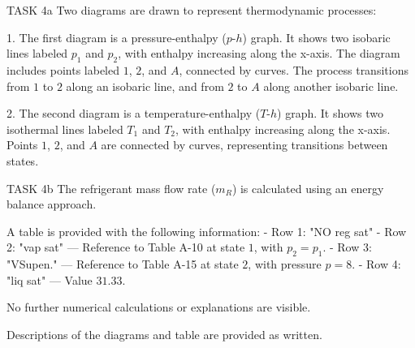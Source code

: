 TASK 4a  
Two diagrams are drawn to represent thermodynamic processes:  

1. The first diagram is a pressure-enthalpy (\(p\)-\(h\)) graph. It shows two isobaric lines labeled \(p_1\) and \(p_2\), with enthalpy increasing along the x-axis. The diagram includes points labeled \(1\), \(2\), and \(A\), connected by curves. The process transitions from \(1\) to \(2\) along an isobaric line, and from \(2\) to \(A\) along another isobaric line.  

2. The second diagram is a temperature-enthalpy (\(T\)-\(h\)) graph. It shows two isothermal lines labeled \(T_1\) and \(T_2\), with enthalpy increasing along the x-axis. Points \(1\), \(2\), and \(A\) are connected by curves, representing transitions between states.  

TASK 4b  
The refrigerant mass flow rate (\(m_R\)) is calculated using an energy balance approach.  

A table is provided with the following information:  
- Row 1: "NO reg sat"  
- Row 2: "vap sat" — Reference to Table A-10 at state \(1\), with \(p_2 = p_1\).  
- Row 3: "VSupen." — Reference to Table A-15 at state \(2\), with pressure \(p = 8\).  
- Row 4: "liq sat" — Value \(31.33\).  

No further numerical calculations or explanations are visible.  

Descriptions of the diagrams and table are provided as written.